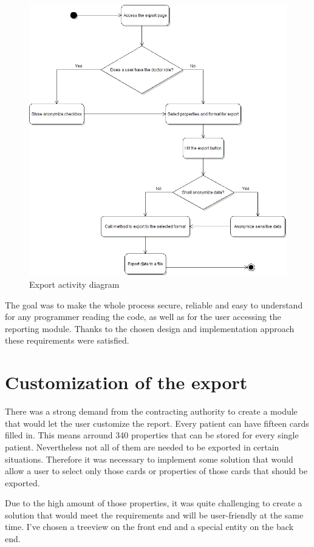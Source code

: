 \documentclass[thesis=B,english]{FITthesis}[2012/10/20]
\begin{document}
\begin{figure}
	\centering
 	\includegraphics[width=1\textwidth]{images/exportDiagram.png}
 	\caption{Export activity diagram}
 	\label{fig:exportDiagram}
\end{figure}

The goal was to make the whole process secure, reliable and easy to understand for any programmer reading the code, as well as for the user accessing the reporting module. Thanks to the chosen design and implementation approach these requirements were satisfied.
\section{Customization of the export}
There was a strong demand from the contracting authority to create a module that would let the user customize the report. Every patient can have fifteen cards filled in. This means arround 340 properties that can be stored for every single patient. Nevertheless not all of them are needed to be exported in certain situations. Therefore it was necessary to implement some solution that would allow a user to select only those cards or properties of those cards that should be exported.

Due to the high amount of those properties, it was quite challenging to create a solution that would meet the requirements and will be user-friendly at the same time. I've chosen a treeview on the front end and a special entity on the back end.
\end{document}
